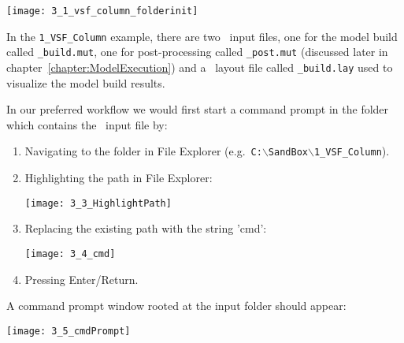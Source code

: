    \texttt{[image: 3\_1\_vsf\_column\_folderinit]}

In the \texttt{1\_VSF\_Column} example, there are two \mut\ input files, one for the model build called \texttt{\_build.mut}, one for post-processing called \texttt{\_post.mut} (discussed later in chapter~\ref{chapter:ModelExecution}) and a \tecplot\ layout file called \texttt{\_build.lay} used to visualize the model build results.


 In our preferred workflow we would first start a command prompt in the folder which contains the \mut\ input file by:
\begin{enumerate}
   \item  Navigating to the folder in File Explorer (e.g.\ \texttt{C:$\backslash$SandBox$\backslash$1\_VSF\_Column}).
   \item  Highlighting the path in File Explorer:

        \texttt{[image: 3\_3\_HighlightPath]}

    \item  Replacing the existing path with the string 'cmd':

        \texttt{[image: 3\_4\_cmd]}

    \item Pressing Enter/Return.
\end{enumerate}
A command prompt window rooted at the input folder should appear:

        \texttt{[image: 3\_5\_cmdPrompt]}



